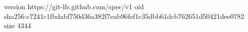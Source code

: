 version https://git-lfs.github.com/spec/v1
oid sha256:c7241c1fbdabf750d36a382f7eab96fef1c35dbb61dcb762651d50421dee0782
size 4344
